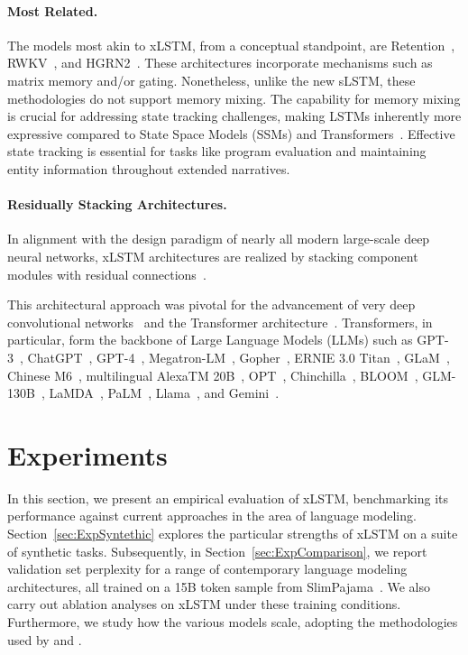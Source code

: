\paragraph{Most Related.} The models most akin to xLSTM, from a conceptual standpoint, are Retention~\citep{Sun:23arxiv}, RWKV~\citep{Peng:23arxivshort,Peng:24arxivshort}, and HGRN2~\citep{Qin:24arxiv}. These architectures incorporate mechanisms such as matrix memory and/or gating. Nonetheless, unlike the new sLSTM, these methodologies do not support memory mixing. The capability for memory mixing is crucial for addressing state tracking challenges, making LSTMs inherently more expressive compared to State Space Models (SSMs) and Transformers~\citep{Merrill:24,Deletang:23}. Effective state tracking is essential for tasks like program evaluation and maintaining entity information throughout extended narratives.

\paragraph{Residually Stacking Architectures.} In alignment with the design paradigm of nearly all modern large-scale deep neural networks, xLSTM architectures are realized by stacking component modules with residual connections~\citep{Srivastava:15,He:16}.

This architectural approach was pivotal for the advancement of very deep convolutional networks~\citep{He:16} and the Transformer architecture~\citep{Vaswani:17}. Transformers, in particular, form the backbone of Large Language Models (LLMs) such as GPT-3~\citep{Brown:20short}, ChatGPT~\citep{Schulman:22short}, GPT-4~\citep{Achiam:23gpt4short}, Megatron-LM~\citep{Shoeybi:19}, Gopher~\citep{Rae:21short}, ERNIE 3.0 Titan~\citep{Wang:21arxivshort}, GLaM~\citep{Du:21glamshort}, Chinese M6~\citep{Lin:21}, multilingual AlexaTM 20B~\citep{Soltan:22}, OPT~\citep{Zhang:22opt}, Chinchilla~\citep{Hoffmann:22short}, BLOOM~\citep{Scao:22arxivshort}, GLM-130B~\citep{Zeng:22arxivshort}, LaMDA~\citep{Thoppilan:22short}, PaLM~\citep{Chowdhery:22short}, Llama~\citep{Touvron:23arxiv}, and Gemini~\citep{GeminiTeam:23arxiv,Reid:24arxiv}.

\section{Experiments}
\label{sec:Exp}

In this section, we present an empirical evaluation of xLSTM, benchmarking its performance against current approaches in the area of language modeling. Section~\ref{sec:ExpSyntethic} explores the particular strengths of xLSTM on a suite of synthetic tasks. Subsequently, in Section~\ref{sec:ExpComparison}, we report validation set perplexity for a range of contemporary language modeling architectures, all trained on a 15B token sample from SlimPajama~\citep{Soboleva:23}. We also carry out ablation analyses on xLSTM under these training conditions. Furthermore, we study how the various models scale, adopting the methodologies used by \citet{Kaplan:20} and \citet{Brown:20short}.

